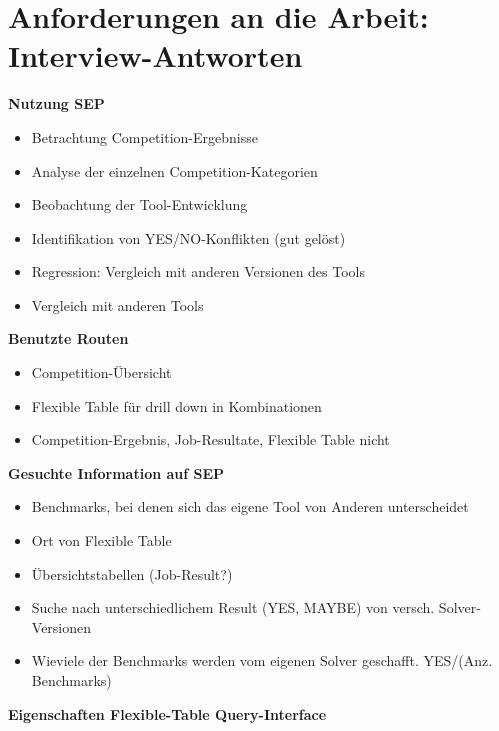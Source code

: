 \newpage

\section{\texorpdfstring{Anforderungen an die Arbeit:
Interview-Antworten
\label{Anhang_Interview_Antworten}}{Anforderungen an die Arbeit: Interview-Antworten }}\label{anforderungen-an-die-arbeit-interview-antworten}

\textbf{Nutzung SEP}

\begin{itemize}
\tightlist
\item
  Betrachtung Competition-Ergebnisse
\item
  Analyse der einzelnen Competition-Kategorien
\item
  Beobachtung der Tool-Entwicklung
\item
  Identifikation von YES/NO-Konflikten (gut gelöst)
\item
  Regression: Vergleich mit anderen Versionen des Tools
\item
  Vergleich mit anderen Tools
\end{itemize}

\textbf{Benutzte Routen}

\begin{itemize}
\tightlist
\item
  Competition-Übersicht
\item
  Flexible Table für drill down in Kombinationen
\item
  Competition-Ergebnis, Job-Resultate, Flexible Table nicht
\end{itemize}

\textbf{Gesuchte Information auf SEP}

\begin{itemize}
\tightlist
\item
  Benchmarks, bei denen sich das eigene Tool von Anderen unterscheidet
\item
  Ort von Flexible Table
\item
  Übersichtstabellen (Job-Result?)
\item
  Suche nach unterschiedlichem Result (YES, MAYBE) von versch.
  Solver-Versionen
\item
  Wieviele der Benchmarks werden vom eigenen Solver geschafft. YES/(Anz.
  Benchmarks)
\end{itemize}

\textbf{Eigenschaften Flexible-Table Query-Interface}

